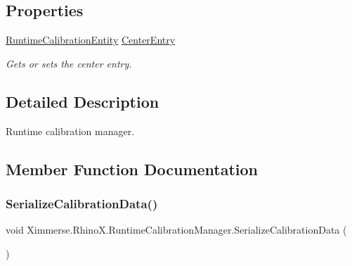 \subsection*{Properties}
\begin{DoxyCompactItemize}
\item 
\mbox{\hyperlink{class_ximmerse_1_1_rhino_x_1_1_runtime_calibration_entity}{Runtime\+Calibration\+Entity}} \mbox{\hyperlink{class_ximmerse_1_1_rhino_x_1_1_runtime_calibration_manager_a1202f2b01cb1c6e6ee7f332ee0ad9e97}{Center\+Entry}}
\begin{DoxyCompactList}\small\item\em Gets or sets the center entry. \end{DoxyCompactList}\end{DoxyCompactItemize}


\subsection{Detailed Description}
Runtime calibration manager. 



\subsection{Member Function Documentation}
\mbox{\label{class_ximmerse_1_1_rhino_x_1_1_runtime_calibration_manager_a2eed7edd69a12c8ff0d3f8b4feb60f49}} 
\subsubsection{\texorpdfstring{Serialize\+Calibration\+Data()}{SerializeCalibrationData()}}
{\footnotesize\ttfamily void Ximmerse.\+Rhino\+X.\+Runtime\+Calibration\+Manager.\+Serialize\+Calibration\+Data (\begin{DoxyParamCaption}{ }\end{DoxyParamCaption})\hspace{0.3cm}{\ttfamily [inline]}}



